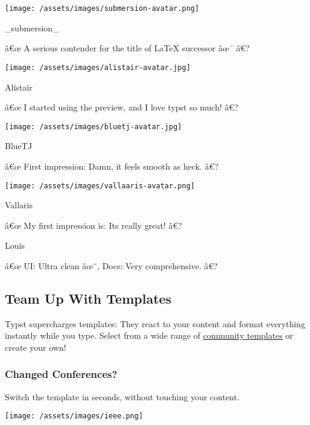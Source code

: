 \texttt{[image: /assets/images/submersion-avatar.png]}

\href{https://www.reddit.com/r/LaTeX/comments/zyuyfc/comment/j2ddt10/?utm_source=share&utm_medium=web2x&context=3}{}

\_submersion\_

â€œ A serious contender for the title of LaTeX successor âœ¨ â€?

\texttt{[image: /assets/images/alistair-avatar.jpg]}

Alistair

â€œ I started using the preview, and I love typst so much! â€?

\texttt{[image: /assets/images/bluetj-avatar.jpg]}

BlueTJ

â€œ First impression: Damn, it feels smooth as heck. â€?

\texttt{[image: /assets/images/vallaaris-avatar.png]}

\href{https://www.reddit.com/r/LaTeX/comments/zyuyfc/comment/j2d8for/?utm_source=share&utm_medium=web2x&context=3}{}

Vallaris

â€œ My first impression is: It\textquotesingle s really great! â€?

Louis

â€œ UI: Ultra clean âœ¨, Docs: Very comprehensive. â€?

\label{powerful-templates}
\subsection{Team Up With Templates}\label{team-up-with-templates}

Typst supercharges templates: They react to your content and format
everything instantly while you type. Select from a wide range of
\href{/universe}{community templates} or create your own!

\subsubsection{Changed Conferences?}\label{changed-conferences}

Switch the template in seconds, without touching your content.

\label{page-carousel}
\texttt{[image: /assets/images/ieee.png]}

